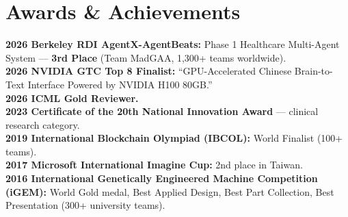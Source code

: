 \documentclass[letterpaper,10pt]{article}
\newcommand{\resumeSubHeadingListStart}{\begin{itemize}[leftmargin=0.15in, label={}]}
\newcommand{\resumeSubHeadingListEnd}{\end{itemize}}
\begin{document}

\section{Awards \& Achievements}
  \vspace{2pt}
  \resumeSubHeadingListStart
    \small{\item{
        \textbf{2026 Berkeley RDI AgentX-AgentBeats:}{ Phase 1 Healthcare Multi-Agent System --- \textbf{3rd Place} (Team MadGAA, 1,300+ teams worldwide).} \\ \vspace{3pt}
        \textbf{2026 NVIDIA GTC Top 8 Finalist:}{ ``GPU-Accelerated Chinese Brain-to-Text Interface Powered by NVIDIA H100 80GB.''} \\ \vspace{3pt}
        \textbf{2026 ICML Gold Reviewer.} \\ \vspace{3pt}
        \textbf{2023 Certificate of the 20th National Innovation Award} --- clinical research category. \\ \vspace{3pt}
        \textbf{2019 International Blockchain Olympiad (IBCOL):}{ World Finalist (100+ teams).} \\ \vspace{3pt}
        \textbf{2017 Microsoft International Imagine Cup:}{ 2nd place in Taiwan.} \\ \vspace{3pt}
        \textbf{2016 International Genetically Engineered Machine Competition (iGEM):}{ World Gold medal, Best Applied Design, Best Part Collection, Best Presentation (300+ university teams).}
    }}
  \resumeSubHeadingListEnd
\end{document}
